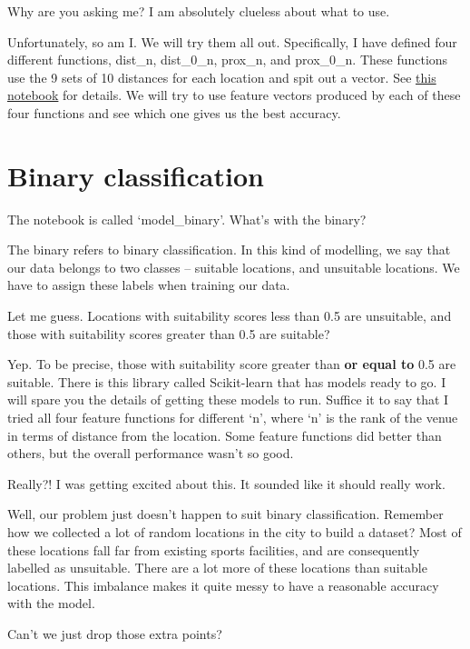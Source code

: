 {\color{blue} Why are you asking me? I am absolutely clueless about what to use.}

Unfortunately, so am I. We will try them all out. Specifically, I have defined four different functions, dist\_n, dist\_0\_n, prox\_n, and prox\_0\_n. These functions use the 9 sets of 10 distances for each location and spit out a vector. See \href{https://github.com/saba-vadarevu/IBM-dataScience-Capstone/blob/master/final/model_binary.ipynb}{this notebook} for details.  
We will try to use feature vectors produced by each of these four functions and see which one gives us the best accuracy. 


\section{Binary classification}

{\color{blue} The notebook is called `model\_binary'. What's with the binary?}

The binary refers to binary classification. In this kind of modelling, we say that our data belongs to two classes -- suitable locations, and unsuitable locations. We have to assign these labels when training our data. 

{\color{blue} Let me guess. Locations with suitability scores less than 0.5 are unsuitable, and those with suitability scores greater than 0.5 are suitable?}

Yep. To be precise, those with suitability score greater than \textbf{or equal to} 0.5 are suitable. There is this library called Scikit-learn that has models ready to go. I will spare you the details of getting these models to run. Suffice it to say that I tried all four feature functions for different `n', where `n' is the rank of the venue in terms of distance from the location. Some feature functions did better than others, but the overall performance wasn't so good.

{\color{blue} Really?! I was getting excited about this. It sounded like it should really work.}

Well, our problem just doesn't happen to suit binary classification. Remember how we collected a lot of random locations in the city to build a dataset? Most of these locations fall far from existing sports facilities, and are consequently labelled as unsuitable. There are a lot more of these locations than suitable locations. This imbalance makes it quite messy to have a reasonable accuracy with the model. 

{\color{blue} Can't we just drop those extra points?}

